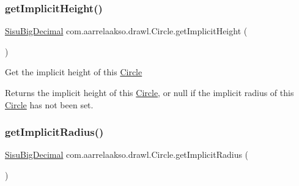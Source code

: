 \mbox{\label{classcom_1_1aarrelaakso_1_1drawl_1_1_circle_a634a3118425b7aa555ef14d0b4441a93}} 
\subsubsection{\texorpdfstring{get\+Implicit\+Height()}{getImplicitHeight()}}
{\footnotesize\ttfamily \hyperlink{classcom_1_1aarrelaakso_1_1drawl_1_1_sisu_big_decimal}{Sisu\+Big\+Decimal} com.\+aarrelaakso.\+drawl.\+Circle.\+get\+Implicit\+Height (\begin{DoxyParamCaption}{ }\end{DoxyParamCaption})\hspace{0.3cm}{\ttfamily [protected]}}

Get the implicit height of this \hyperlink{classcom_1_1aarrelaakso_1_1drawl_1_1_circle}{Circle}

\begin{DoxyReturn}{Returns}
the implicit height of this \hyperlink{classcom_1_1aarrelaakso_1_1drawl_1_1_circle}{Circle}, or {\ttfamily null} if the implicit radius of this \hyperlink{classcom_1_1aarrelaakso_1_1drawl_1_1_circle}{Circle} has not been set. 
\end{DoxyReturn}
\mbox{\label{classcom_1_1aarrelaakso_1_1drawl_1_1_circle_a8991b4ff460833d4198dc692241f142f}} 
\subsubsection{\texorpdfstring{get\+Implicit\+Radius()}{getImplicitRadius()}}
{\footnotesize\ttfamily \hyperlink{classcom_1_1aarrelaakso_1_1drawl_1_1_sisu_big_decimal}{Sisu\+Big\+Decimal} com.\+aarrelaakso.\+drawl.\+Circle.\+get\+Implicit\+Radius (\begin{DoxyParamCaption}{ }\end{DoxyParamCaption})\hspace{0.3cm}{\ttfamily [protected]}}

